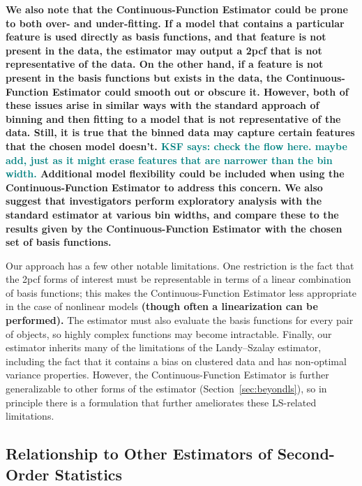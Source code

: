 \documentclass[modern]{aastex62}
\newcommand{\cf}{2pcf\xspace}
\newcommand{\est}{the Continuous-Function Estimator\xspace}
\newcommand{\LS}{LS\xspace}
\newcommand{\KSF}[1]{\textcolor{teal}{KSF says: #1}}
\newcommand{\new}[1]{\textbf{#1}}
\begin{document}
\new{We also note that \est could be prone to both over- and under-fitting.
If a model that contains a particular feature is used directly as basis functions, and that feature is not present in the data, the estimator may output a \cf that is not representative of the data.
On the other hand, if a feature is not present in the basis functions but exists in the data, \est could smooth out or obscure it.
However, both of these issues arise in similar ways with the standard approach of binning and then fitting to a model that is not representative of the data.
Still, it is true that the binned data may capture certain features that the chosen model doesn't.
\KSF{check the flow here. maybe add, just as it might erase features that are narrower than the bin width.}
Additional model flexibility could be included when using \est to address this concern.
We also suggest that investigators perform exploratory analysis with the standard estimator at various bin widths, and compare these to the results given by \est with the chosen set of basis functions.}

Our approach has a few other notable limitations.
One restriction is the fact that the \cf forms of interest must be representable in terms of a linear combination of basis functions; this makes \est less appropriate in the case of nonlinear models \new{(though often a linearization can be performed).}
The estimator must also evaluate the basis functions for every pair of objects, so highly complex functions may become intractable.
Finally, our estimator inherits many of the limitations of the Landy--Szalay estimator, including the fact that it contains a bias on clustered data and has non-optimal variance properties.
However, \est is further generalizable to other forms of the estimator (Section~\ref{sec:beyondls}), so in principle there is a formulation that further ameliorates these \LS-related limitations.

\subsection{Relationship to Other Estimators of Second-Order Statistics}
\label{sec:otherest}
\end{document}
